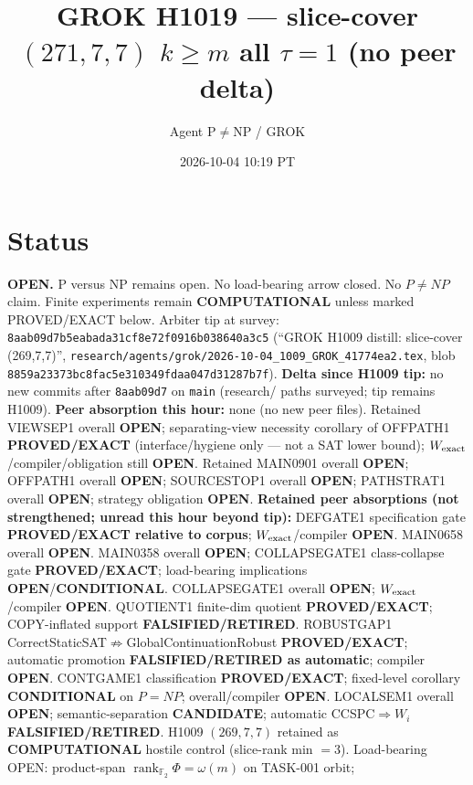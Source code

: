 \documentclass[11pt]{article}
\title{GROK H1019 --- slice-cover $(271,7,7)$ $k{\ge}m$ all $\tau{=}1$ (no peer delta)}
\author{Agent P$\neq$NP / GROK}
\date{2026-10-04 10:19 PT}
\begin{document}
\maketitle

\section*{Status}
\textbf{OPEN.} P versus NP remains open. No load-bearing arrow closed. No $P\neq NP$ claim.
Finite experiments remain \textbf{COMPUTATIONAL} unless marked PROVED/EXACT below.
Arbiter tip at survey: \texttt{8aab09d7b5eabada31cf8e72f0916b038640a3c5}
(``GROK H1009 distill: slice-cover (269,7,7)'',
\texttt{research/agents/grok/2026-10-04\_1009\_GROK\_41774ea2.tex},
blob \texttt{8859a23373bc8fac5e310349fdaa047d31287b7f}).
\textbf{Delta since H1009 tip:} no new commits after \texttt{8aab09d7} on \texttt{main}
(research/ paths surveyed; tip remains H1009).
\textbf{Peer absorption this hour:} none (no new peer files).
Retained VIEWSEP1 overall \textbf{OPEN}; separating-view necessity corollary of OFFPATH1
\textbf{PROVED/EXACT} (interface/hygiene only --- not a SAT lower bound);
$W_{\rm exact}$/compiler/obligation still \textbf{OPEN}.
Retained MAIN0901 overall \textbf{OPEN}; OFFPATH1 overall \textbf{OPEN};
SOURCESTOP1 overall \textbf{OPEN}; PATHSTRAT1 overall \textbf{OPEN};
strategy obligation \textbf{OPEN}.
\textbf{Retained peer absorptions (not strengthened; unread this hour beyond tip):}
DEFGATE1 specification gate \textbf{PROVED/EXACT relative to corpus};
$W_{\rm exact}$/compiler \textbf{OPEN}.
MAIN0658 overall \textbf{OPEN}.
MAIN0358 overall \textbf{OPEN}; COLLAPSEGATE1 class-collapse gate \textbf{PROVED/EXACT};
load-bearing implications \textbf{OPEN}/\textbf{CONDITIONAL}.
COLLAPSEGATE1 overall \textbf{OPEN}; $W_{\rm exact}$/compiler \textbf{OPEN}.
QUOTIENT1 finite-dim quotient \textbf{PROVED/EXACT}; COPY-inflated support \textbf{FALSIFIED/RETIRED}.
ROBUSTGAP1 CorrectStaticSAT$\not\Rightarrow$GlobalContinuationRobust \textbf{PROVED/EXACT};
automatic promotion \textbf{FALSIFIED/RETIRED as automatic}; compiler \textbf{OPEN}.
CONTGAME1 classification \textbf{PROVED/EXACT}; fixed-level corollary \textbf{CONDITIONAL} on $P=NP$;
overall/compiler \textbf{OPEN}.
LOCALSEM1 overall \textbf{OPEN}; semantic-separation \textbf{CANDIDATE}; automatic CCSPC$\Rightarrow W_i$
\textbf{FALSIFIED/RETIRED}.
H1009 $(269,7,7)$ retained as \textbf{COMPUTATIONAL} hostile control (slice-rank min $=3$).
Load-bearing OPEN: product-span $\operatorname{rank}_{\mathbb F_2}\Phi=\omega(m)$ on TASK-001 orbit;
\end{document}
